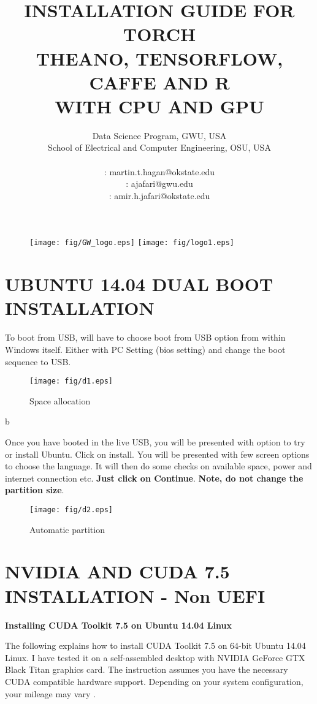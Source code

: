 \documentclass[12pt]{article}
\title{\textbf{INSTALLATION GUIDE FOR TORCH}\\\textbf{THEANO, TENSORFLOW, CAFFE AND R}\\ \textbf{WITH CPU AND GPU}}%
\author{Data Science Program, GWU, USA \\
School of Electrical and Computer Engineering, OSU, USA\\
\vspace{1cm}\\
\Letter : martin.t.hagan@okstate.edu\\
\Letter : ajafari@gwu.edu\\
\Letter : amir.h.jafari@okstate.edu  }
\begin{document}
\begin{figure}
\centering \texttt{[image: fig/GW\_logo.eps]}\hfill
\centering \texttt{[image: fig/logo1.eps]}\hfill
\end{figure}

\maketitle
\newpage
\tableofcontents
\newpage
\listoffigures
\newpage
\section{UBUNTU 14.04 DUAL BOOT INSTALLATION}

To boot from USB, will have to choose boot from USB option from within Windows itself. Either with PC Setting (bios setting) and change the boot sequence to USB.
\begin{figure}[h]
\centering \texttt{[image: fig/d1.eps]}
\caption{Space allocation}
\end{figure}b

Once you have booted in the live USB, you will be presented with option to try or install Ubuntu. Click on install. You will be presented with few screen options to choose the language. It will then do some checks on available space, power and internet connection etc. \textbf{Just click on Continue}. \textbf{Note, do not change the partition size}.
\begin{figure}[h]
\centering \texttt{[image: fig/d2.eps]}
\caption{Automatic partition}
\end{figure}

\newpage


\section{NVIDIA AND CUDA 7.5 INSTALLATION - Non UEFI}

\textbf{Installing CUDA Toolkit 7.5 on Ubuntu 14.04 Linux}

The following explains how to install CUDA Toolkit 7.5 on 64-bit Ubuntu 14.04 Linux. I have tested it on a self-assembled desktop with NVIDIA GeForce GTX Black Titan graphics card. The instruction assumes you have the necessary CUDA compatible hardware support. Depending on your system configuration, your mileage may vary \cite{NVIDIADRIVER}.
\end{document}
